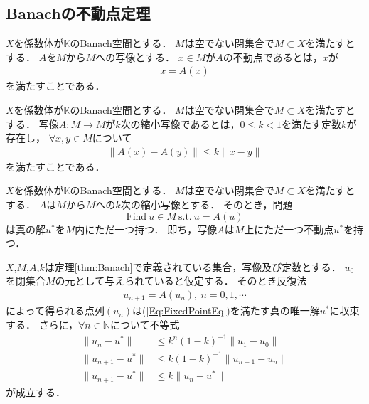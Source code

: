 \subsection{Banachの不動点定理}
\begin{defi}[不動点]
$X$を係数体が${\mathbb K}$のBanach空間とする．
$M$は空でない閉集合で$M \subset X$を満たすとする．
$A$を$M$から$M$への写像とする．
$x \in M$が$A$の不動点であるとは，$x$が
\begin{align*}
x = A(x)
\end{align*}
を満たすことである．
\end{defi}
         
\begin{defi}[縮小写像]
$X$を係数体が${\mathbb K}$のBanach空間とする．
$M$は空でない閉集合で$M \subset X$を満たすとする．
写像$A: M \rightarrow M$が$k$次の縮小写像であるとは，$0 \le k < 1$を満たす定数$k$が存在し，
$\forall x,y \in M$について
\begin{align*}
\| A(x) - A(y) \| \le k \| x - y\|
\end{align*}
を満たすことである．
\end{defi}

\begin{Thm}[Banachの不動点定理]\label{thm:Banach}
$X$を係数体が${\mathbb K}$のBanach空間とする．
$M$は空でない閉集合で$M \subset X$を満たすとする．
$A$は$M$から$M$への$k$次の縮小写像とする．
そのとき，問題
\begin{equation}
\text{Find} ~ u \in M ~ \text{s.t.} ~ u = A(u)
\label{Eq:FixedPointEq}
\end{equation}
は真の解$u^*$を$M$内にただ一つ持つ．
即ち，写像$A$は$M$上にただ一つ不動点$u^*$を持つ．
\end{Thm}

\begin{Cor}\label{cor:Banach}
$X$,$M$,$A$,$k$は定理\ref{thm:Banach}で定義されている集合，写像及び定数とする．
$u_0$を閉集合$M$の元として与えられていると仮定する．
そのとき反復法
\begin{align*}
u_{n+1} = A(u_n), ~ n = 0,1,\cdots
\end{align*}
によって得られる点列$(u_n)$は(\ref{Eq:FixedPointEq})を満たす真の唯一解$u^{*}$に収束する．
さらに，$\forall n \in {\mathbb N}$について不等式
\begin{align}
\| u_n - u^* \| &\le k^n (1-k)^{-1} \| u_1 - u_0 \| \label{Ine:Apri} \\
\| u_{n+1} - u^* \| &\le k (1-k)^{-1} \| u_{n+1} - u_n \| \label{Ine:Apos} \\
\| u_{n+1} - u^* \| &\le k \| u_n - u^* \| \label{Ine:rate}
\end{align}
が成立する．
\end{Cor}


